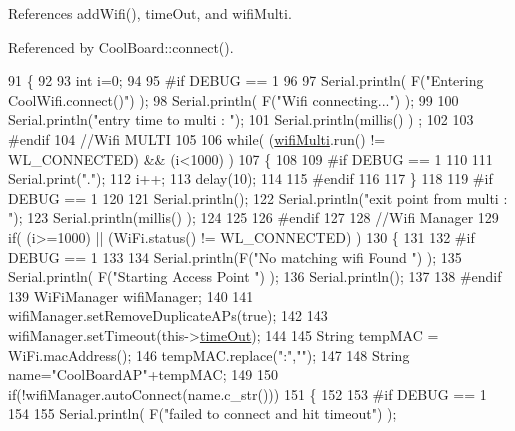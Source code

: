 References add\+Wifi(), time\+Out, and wifi\+Multi.



Referenced by Cool\+Board\+::connect().


\begin{DoxyCode}
91 \{       
92 
93     \textcolor{keywordtype}{int} i=0;
94 
95 \textcolor{preprocessor}{#if DEBUG == 1 }
96 
97     Serial.println( F(\textcolor{stringliteral}{"Entering CoolWifi.connect()"}) );
98     Serial.println( F(\textcolor{stringliteral}{"Wifi connecting..."}) );
99     
100     Serial.println(\textcolor{stringliteral}{"entry time to multi : "});
101     Serial.println(millis() ) ;
102 
103 \textcolor{preprocessor}{#endif}
104     \textcolor{comment}{//Wifi MULTI}
105 
106     \textcolor{keywordflow}{while}( (\hyperlink{classCoolWifi_a7862a8c0d7239877e2956c14a368aab8}{wifiMulti}.run() != WL\_CONNECTED) && (i<1000)  ) 
107     \{
108 
109 \textcolor{preprocessor}{    #if DEBUG == 1}
110 
111             Serial.print(\textcolor{stringliteral}{"."});
112         i++;
113         delay(10);
114     
115 \textcolor{preprocessor}{    #endif}
116 
117         \}   
118 
119 \textcolor{preprocessor}{#if DEBUG == 1 }
120 
121     Serial.println();   
122     Serial.println(\textcolor{stringliteral}{"exit point from multi : "});
123     Serial.println(millis() );
124 
125 
126 \textcolor{preprocessor}{#endif}
127 
128     \textcolor{comment}{//Wifi Manager}
129     \textcolor{keywordflow}{if}( (i>=1000) ||  (WiFi.status() != WL\_CONNECTED) ) 
130     \{
131     
132 \textcolor{preprocessor}{    #if DEBUG == 1 }
133         
134         Serial.println(F(\textcolor{stringliteral}{"No matching wifi Found "}) );
135         Serial.println( F(\textcolor{stringliteral}{"Starting Access Point "}) );  
136         Serial.println();
137     
138 \textcolor{preprocessor}{    #endif}
139         WiFiManager wifiManager;
140         
141         wifiManager.setRemoveDuplicateAPs(\textcolor{keyword}{true});
142     
143         wifiManager.setTimeout(this->\hyperlink{classCoolWifi_a952111605f25156588b5632caaba1c6f}{timeOut});
144         
145         String tempMAC = WiFi.macAddress();
146         tempMAC.replace(\textcolor{stringliteral}{":"},\textcolor{stringliteral}{""});
147     
148         String name=\textcolor{stringliteral}{"CoolBoardAP"}+tempMAC;  
149 
150         \textcolor{keywordflow}{if}(!wifiManager.autoConnect(name.c\_str())) 
151         \{
152         
153 \textcolor{preprocessor}{        #if DEBUG == 1}
154 
155             Serial.println( F(\textcolor{stringliteral}{"failed to connect and hit timeout"}) );

\end{DoxyCode}
